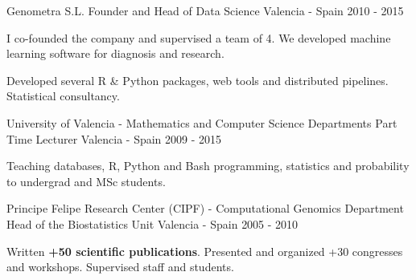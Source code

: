 \begin{cventries}

\cventry
{Genometra S.L.} %
{Founder and Head of Data Science} %
{Valencia - Spain} %
{2010 - 2015} %
{ %
\begin{cvitems}
\item {I co-founded the company and supervised a team of 4. We developed machine learning software for diagnosis and research.}
\item {Developed several R \& Python packages, web tools and distributed pipelines. Statistical consultancy.}
\end{cvitems} 
}




\cventry
{University of Valencia - Mathematics and Computer Science Departments} %
{Part Time Lecturer} %
{Valencia - Spain} %
{2009 - 2015} %
{ %
\begin{cvitems}
\item {Teaching databases, R, Python and Bash programming, statistics and probability to undergrad and MSc students.}
\end{cvitems} 
}


\cventry
{Principe Felipe Research Center (CIPF) - Computational Genomics Department} %
{Head of the Biostatistics Unit} %
{Valencia - Spain} %
{2005 - 2010} %
{ %
\begin{cvitems}
\item {Written \textbf{+50 scientific publications}. Presented and organized +30 congresses and workshops. Supervised staff and students.}
\end{cvitems} 
}


\end{cventries}
